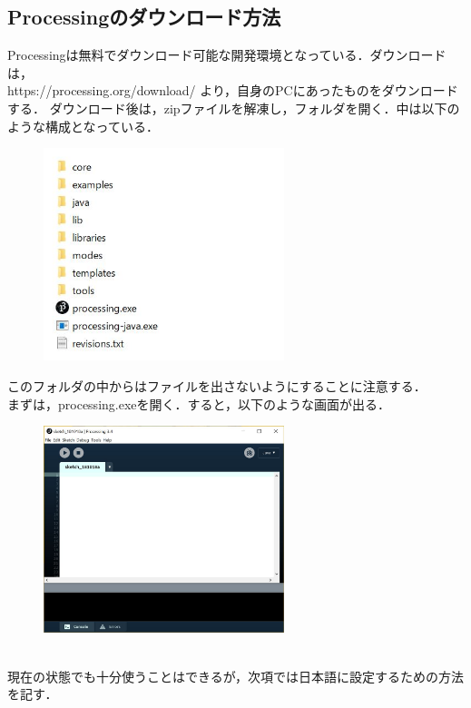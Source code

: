 \documentclass[a4j]{jarticle}
\begin{document}
\subsection{Processingのダウンロード方法}
Processingは無料でダウンロード可能な開発環境となっている．ダウンロードは，\\
https://processing.org/download/ より，自身のPCにあったものをダウンロードする．
ダウンロード後は，zipファイルを解凍し，フォルダを開く．中は以下のような構成となっている．\\
\begin{figure}[h]
\includegraphics[width=7cm]{t-1.JPG}
\end{figure}
このフォルダの中からはファイルを出さないようにすることに注意する．\\
まずは，processing.exeを開く．すると，以下のような画面が出る．\\
\begin{figure}[h]
\includegraphics[width=7cm]{t-2.JPG}
\end{figure}
\\
現在の状態でも十分使うことはできるが，次項では日本語に設定するための方法を記す．
\newpage
\end{document}
